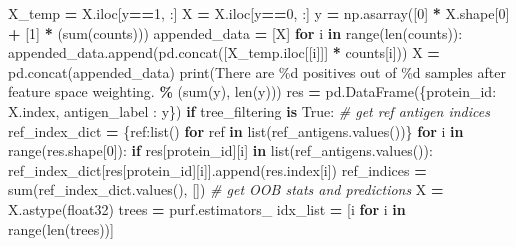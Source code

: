 \documentclass[
  11pt,
  oneside]{book}
\newenvironment{Shaded}{\begin{snugshade}}{\end{snugshade}}
\newcommand{\BuiltInTok}[1]{#1}
\newcommand{\CommentTok}[1]{\textcolor[rgb]{0.56,0.35,0.01}{\textit{#1}}}
\newcommand{\ControlFlowTok}[1]{\textcolor[rgb]{0.13,0.29,0.53}{\textbf{#1}}}
\newcommand{\DecValTok}[1]{\textcolor[rgb]{0.00,0.00,0.81}{#1}}
\newcommand{\KeywordTok}[1]{\textcolor[rgb]{0.13,0.29,0.53}{\textbf{#1}}}
\newcommand{\NormalTok}[1]{#1}
\newcommand{\OperatorTok}[1]{\textcolor[rgb]{0.81,0.36,0.00}{\textbf{#1}}}
\newcommand{\SpecialCharTok}[1]{\textcolor[rgb]{0.00,0.00,0.00}{#1}}
\newcommand{\StringTok}[1]{\textcolor[rgb]{0.31,0.60,0.02}{#1}}
\newcommand{\VariableTok}[1]{\textcolor[rgb]{0.00,0.00,0.00}{#1}}
\begin{document}
\begin{Shaded}
\begin{Highlighting}[]
\NormalTok{    X\_temp }\OperatorTok{=}\NormalTok{ X.iloc[y}\OperatorTok{==}\DecValTok{1}\NormalTok{, :]}
\NormalTok{    X }\OperatorTok{=}\NormalTok{ X.iloc[y}\OperatorTok{==}\DecValTok{0}\NormalTok{, :]}
\NormalTok{    y }\OperatorTok{=}\NormalTok{ np.asarray([}\DecValTok{0}\NormalTok{] }\OperatorTok{*}\NormalTok{ X.shape[}\DecValTok{0}\NormalTok{] }\OperatorTok{+}\NormalTok{ [}\DecValTok{1}\NormalTok{] }\OperatorTok{*}\NormalTok{ (}\BuiltInTok{sum}\NormalTok{(counts)))}
\NormalTok{    appended\_data }\OperatorTok{=}\NormalTok{ [X]}
    \ControlFlowTok{for}\NormalTok{ i }\KeywordTok{in} \BuiltInTok{range}\NormalTok{(}\BuiltInTok{len}\NormalTok{(counts)):}
\NormalTok{        appended\_data.append(pd.concat([X\_temp.iloc[[i]]] }\OperatorTok{*}\NormalTok{ counts[i]))}
\NormalTok{    X }\OperatorTok{=}\NormalTok{ pd.concat(appended\_data)}
        \BuiltInTok{print}\NormalTok{(}\StringTok{\textquotesingle{}There are }\SpecialCharTok{\%d}\StringTok{ positives out of }\SpecialCharTok{\%d}\StringTok{ samples after feature space weighting.\textquotesingle{}} \OperatorTok{\%}\NormalTok{ (}\BuiltInTok{sum}\NormalTok{(y), }\BuiltInTok{len}\NormalTok{(y)))}
\NormalTok{    res }\OperatorTok{=}\NormalTok{ pd.DataFrame(\{}\StringTok{\textquotesingle{}protein\_id\textquotesingle{}}\NormalTok{: X.index, }\StringTok{\textquotesingle{}antigen\_label\textquotesingle{}}\NormalTok{ : y\})}
    \ControlFlowTok{if}\NormalTok{ tree\_filtering }\KeywordTok{is} \VariableTok{True}\NormalTok{:}
        \CommentTok{\# get ref antigen indices}
\NormalTok{        ref\_index\_dict }\OperatorTok{=}\NormalTok{ \{ref:}\BuiltInTok{list}\NormalTok{() }\ControlFlowTok{for}\NormalTok{ ref }\KeywordTok{in} \BuiltInTok{list}\NormalTok{(ref\_antigens.values())\}}
        \ControlFlowTok{for}\NormalTok{ i }\KeywordTok{in} \BuiltInTok{range}\NormalTok{(res.shape[}\DecValTok{0}\NormalTok{]):}
            \ControlFlowTok{if}\NormalTok{ res[}\StringTok{\textquotesingle{}protein\_id\textquotesingle{}}\NormalTok{][i] }\KeywordTok{in} \BuiltInTok{list}\NormalTok{(ref\_antigens.values()):}
\NormalTok{                ref\_index\_dict[res[}\StringTok{\textquotesingle{}protein\_id\textquotesingle{}}\NormalTok{][i]].append(res.index[i])}
\NormalTok{        ref\_indices }\OperatorTok{=} \BuiltInTok{sum}\NormalTok{(ref\_index\_dict.values(), [])}
        \CommentTok{\# get OOB stats and predictions}
\NormalTok{        X }\OperatorTok{=}\NormalTok{ X.astype(}\StringTok{\textquotesingle{}float32\textquotesingle{}}\NormalTok{)}
\NormalTok{        trees }\OperatorTok{=}\NormalTok{ purf.estimators\_}
\NormalTok{        idx\_list }\OperatorTok{=}\NormalTok{ [i }\ControlFlowTok{for}\NormalTok{ i }\KeywordTok{in} \BuiltInTok{range}\NormalTok{(}\BuiltInTok{len}\NormalTok{(trees))]}

\end{Highlighting}
\end{Shaded}
\end{document}
